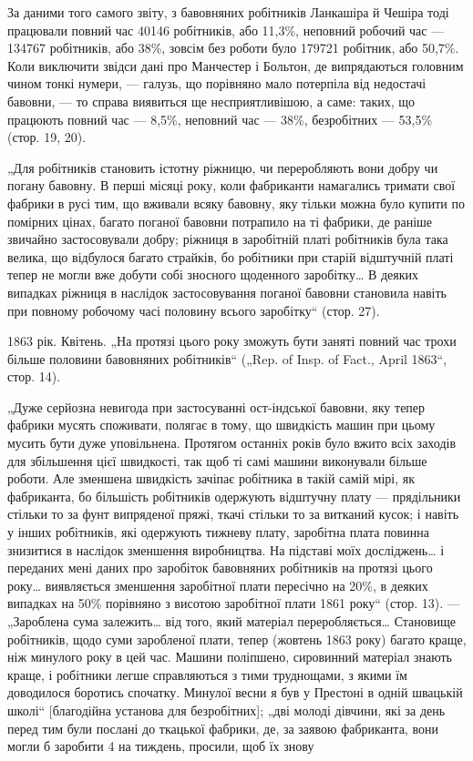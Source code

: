 
За даними того самого звіту, з бавовняних робітників Ланкашіра
й Чешіра тоді працювали повний час \num{40146} робітників,
або 11,3\%, неповний робочий час — \num{134767} робітників, або 38\%,
зовсім без роботи було \num{179721} робітник, або 50,7\%. Коли виключити
звідси дані про Манчестер і Больтон, де випрядаються
головним чином тонкі нумери, — галузь, що порівняно мало потерпіла
від недостачі бавовни, — то справа виявиться ще несприятливішою, а
саме: таких, що працюють повний час — 8,5\%,
неповний час — 38\%, безробітних — 53,5\% (стор. 19, 20).

„Для робітників становить істотну ріжницю, чи переробляють
вони добру чи погану бавовну. В перші місяці року, коли фабриканти
намагались тримати свої фабрики в русі тим, що вживали
всяку бавовну, яку тільки можна було купити по помірних цінах,
багато поганої бавовни потрапило на ті фабрики, де раніше звичайно
застосовували добру; ріжниця в заробітній платі робітників
була така велика, що відбулося багато страйків, бо робітники
при старій відштучній платі тепер не могли вже добути
собі зносного щоденного заробітку\dots{} В деяких випадках ріжниця
в наслідок застосовування поганої бавовни становила навіть при
повному робочому часі половину всього заробітку“ (стор. 27).

1863 рік. Квітень. „На протязі цього року зможуть бути заняті
повний час трохи більше половини бавовняних робітників“
(„Rep. of Insp. of Fact., April 1863“, стор. 14).

„Дуже серйозна невигода при застосуванні ост-індської бавовни,
яку тепер фабрики мусять споживати, полягає в тому,
що швидкість машин при цьому мусить бути дуже уповільнена.
Протягом останніх років було вжито всіх заходів для збільшення
цієї швидкості, так щоб ті самі машини виконували більше
роботи. Але зменшена швидкість зачіпає робітника в такій самій
мірі, як фабриканта, бо більшість робітників одержують відштучну
плату — прядільники стільки то за фунт випряденої
пряжі, ткачі стільки то за витканий кусок; і навіть у інших
робітників, які одержують тижневу плату, заробітна плата повинна
знизитися в наслідок зменшення виробництва. На підставі
моїх досліджень\dots{} і переданих мені даних про заробіток бавовняних
робітників на протязі цього року\dots{} виявляється зменшення
заробітної плати пересічно на 20\%, в деяких випадках
на 50\% порівняно з висотою заробітної плати 1861 року“
(стор. 13). — „Зароблена сума залежить\dots{} від того, який матеріал
переробляється\dots{} Становище робітників, щодо суми заробленої
плати, тепер (жовтень 1863 року) багато краще, ніж минулого
року в цей час. Машини поліпшено, сировинний матеріал
знають краще, і робітники легше справляються з тими труднощами,
з якими їм доводилося боротись спочатку. Минулої весни
я був у Престоні в одній швацькій школі“ [благодійна установа
для безробітних]; „дві молоді дівчини, які за день перед тим
були послані до ткацької фабрики, де, за заявою фабриканта, вони
могли б заробити 4 на тиждень, просили, щоб їх знову
\parbreak{}  %
